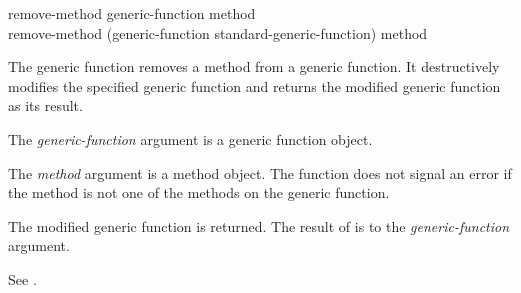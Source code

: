 \begin{defun}
remove-method generic-function method \\
remove-method (generic-function standard-generic-function) method

The generic function  removes a method from a
generic function.  It destructively modifies the specified generic
function and returns the modified generic function as its result.





The \emph{generic-function\/} argument is a generic function
object.

The \emph{method\/} argument is a method object.  The function 
 does not signal an error if the method is not one of the
methods on the generic function.


The modified generic function is returned.  The result of  
is  to the \emph{generic-function\/} argument.

See .
\end{defun}

